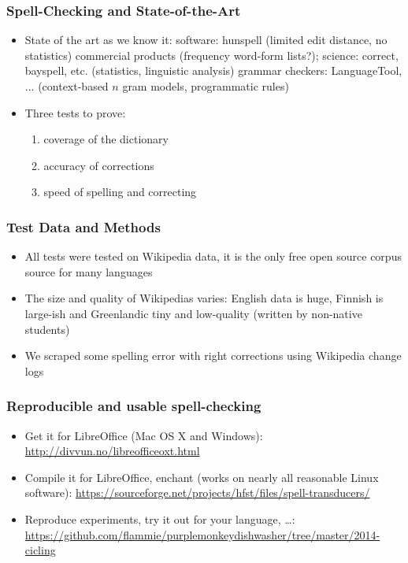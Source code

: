 \documentclass[t,12pt]{beamer}
\begin{document}
\begin{frame}
    \frametitle{Spell-Checking and State-of-the-Art}
    \begin{itemize}
        \item State of the art as we know it: software: hunspell (limited
            edit distance, no statistics) commercial products (frequency word-form lists?); science: correct, bayspell, etc. (statistics, linguistic analysis)
        grammar checkers: LanguageTool, ... (context-based \(n\) gram
            models, programmatic rules)
        \item Three tests to prove: \begin{enumerate}
                \item coverage of the dictionary
                \item accuracy of corrections
                \item speed of spelling and correcting
            \end{enumerate}
    \end{itemize}
\end{frame}

\begin{frame}
    \frametitle{Test Data and Methods}
    \begin{itemize}
        \item All tests were tested on Wikipedia data, it is the only free
            open source corpus source for many languages
        \item The size and quality of Wikipedias varies: English data is
            huge, Finnish is large-ish and Greenlandic tiny and low-quality
            (written by non-native students)

        \item We scraped some spelling error with right corrections using
            Wikipedia change logs
    \end{itemize}
\end{frame}

\begin{frame}[label=links]
    \frametitle{Reproducible and usable spell-checking}
    \begin{itemize}
        \item Get it for LibreOffice (Mac OS X and Windows):
            \url{http://divvun.no/libreofficeoxt.html}
        \item Compile it for LibreOffice, enchant (works on nearly all
            reasonable Linux software):
            \url{https://sourceforge.net/projects/hfst/files/spell-transducers/}
        \item Reproduce experiments, try it out for your language, \ldots:
            \url{https://github.com/flammie/purplemonkeydishwasher/tree/master/2014-cicling}
    \end{itemize}
\end{frame}
\end{document}
